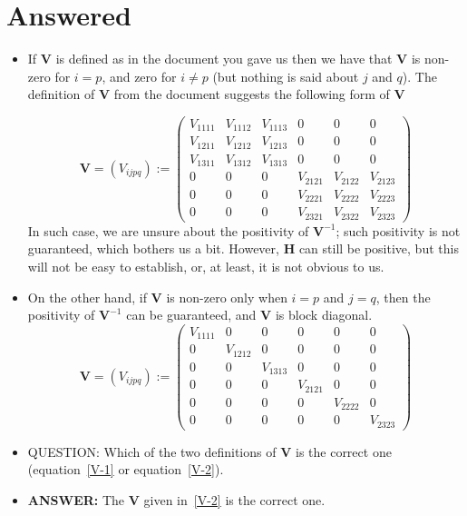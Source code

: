 \documentclass[12pt]{amsart}
\theoremstyle{definition}
\begin{document}
\section{Answered\label{sec:answers}}
\begin{itemize}
\item If $\bm V$ is defined as in the document you gave us then we have that $\bm V$ is non-zero for $i=p$, and zero for $i\neq p$ (but nothing is said about $j$ and $q$). The definition of $\bm V$  from the document suggests the following form of $\bm V$
 
\begin{equation}\label{V-1}
\bm V = (V_{ijpq}):=\begin{pmatrix}
V_{1111} & V_{1112} & V_{1113} &  0 &  0 & 0 \\
V_{1211} & V_{1212} & V_{1213} &  0 &  0 & 0 \\
V_{1311} & V_{1312} & V_{1313} &  0 &  0 & 0 \\
0 & 0 & 0 & V_{2121} &  V_{2122} & V_{2123} \\
0 &  0 & 0 & V_{2221} &  V_{2222} & V_{2223} \\
0 &  0 & 0 & V_{2321} &  V_{2322} & V_{2323}
\end{pmatrix}
\end{equation}
In such case, we are unsure about the positivity of $\bm V^{-1}$; such positivity is not guaranteed, which bothers us a bit. However, $\bm H$ can still be positive, but this will not be easy to establish, or, at least, it is not obvious to us.

\item On the other hand, if $\bm V$ is non-zero only when $i=p$ and $j=q$, then the positivity of $\bm{V}^{-1}$ can be guaranteed, and $\bm{V}$ is block diagonal.
\begin{equation}\label{V-2}
\bm V =  (V_{ijpq}) := \begin{pmatrix}
V_{1111} & 0 & 0 &  0 &  0 & 0 \\
0 & V_{1212} & 0 &  0 &  0 & 0 \\
0 & 0 & V_{1313} &  0 &  0 & 0 \\
0 & 0 & 0 & V_{2121} &  0 & 0 \\
0 &  0 & 0 & 0 &  V_{2222} & 0 \\
0 &  0 & 0 & 0 &  0 & V_{2323}
\end{pmatrix}
\end{equation}
\item {QUESTION: Which of the two definitions of $\bm V$ is the correct one (equation~\eqref{V-1} or equation~\eqref{V-2})}. 
\item {\bf ANSWER:} The $\bm V$ given in~\eqref{V-2} is the correct one. 


\end{itemize}
\end{document}
